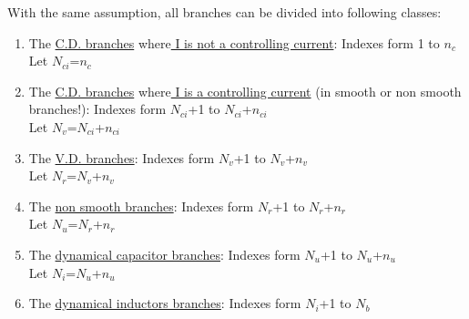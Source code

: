 \documentclass[10pt]{article}
\begin{document}
With the same assumption, all branches can be divided into following classes:\\
\begin{enumerate}
\item The  \underline{C.D. branches} where\underline{ I is not a controlling current}: Indexes form 1 to $n_{c}$\\
  Let $N_{ci}$=$n_{c}$
\item The  \underline{C.D.  branches} where\underline{ I is a controlling current} (in smooth or non smooth branches!): Indexes form $N_{ci}$+1 to $N_{ci}$+$n_{ci}$\\
  Let $N_{v}$=$N_{ci}$+$n_{ci}$
\item The  \underline{V.D. branches}: Indexes form $N_{v}$+1 to $N_{v}$+$n_{v}$ \\
  Let $N_{r}$=$N_{v}$+$n_{v}$
 \item The  \underline{non smooth branches}: Indexes form $N_{r}$+1 to $N_{r}$+$n_{r}$\\
  Let $N_{u}$=$N_{r}$+$n_{r}$
 \item The \underline{dynamical capacitor branches}: Indexes form $N_{u}$+1 to $N_{u}$+$n_{u}$\\
  Let $N_{i}$=$N_{u}$+$n_{u}$
 \item The \underline{dynamical inductors branches}: Indexes form $N_{i}$+1 to $N_{b}$ \\
\end{enumerate}


\newpage
\end{document}
